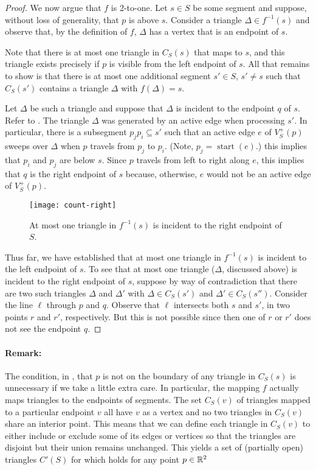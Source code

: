 \documentclass{patmorin}
\DeclareMathOperator{\start}{start}
\begin{document}
\begin{proof}
We now argue that $f$ is 2-to-one.  Let $s\in S$ be some segment and
suppose, without loss of generality, that $p$ is above $s$.  Consider a
triangle $\Delta \in f^{-1}(s)$ and observe that, by the definition of $f$,
$\Delta$ has a vertex that is an endpoint of $s$.

Note that there is at most one triangle in $C_S(s)$ that maps to $s$, and
this triangle exists precisely if $p$ is visible from the left endpoint of
$s$.  All that remains to show is that there is at most one additional
segment $s'\in S$, $s'\neq s$ such that $C_S(s')$ contains a triangle
$\Delta$ with $f(\Delta)=s$.

Let $\Delta$ be such a triangle and suppose that $\Delta$ is incident to
the endpoint $q$ of $s$.  Refer to .  The triangle
$\Delta$ was generated by an active edge when processing $s'$.  In
particular, there is a subsegment $p_j p_i\subseteq s'$ such that an active
edge $e$ of $V^+_S(p)$ sweeps over $\Delta$ when $p$ travels from $p_j$ to
$p_i$. (Note, $p_j=\start(e)$.) this implies that $p_i$ and $p_j$ are below
$s$. Since $p$ travels from left to right along $e$, this implies that $q$
is the right endpoint of $s$ because, otherwise, $e$ would not be an active
edge of $V^+_S(p)$.

\begin{figure}
  \begin{center}
    \texttt{[image: count-right]}
  \end{center}
  \caption{At most one triangle in $f^{-1}(s)$ is incident to the right
           endpoint of $S$.}
\end{figure}

Thus far, we have established that at most one triangle in $f^{-1}(s)$ is
incident to the left endpoint of $s$.  To see that at most one triangle
($\Delta$, discussed above) is incident to the right endpoint of $s$,
suppose by way of contradiction that there are two such triangles $\Delta$
and $\Delta'$ with $\Delta\in C_S(s')$ and $\Delta'\in C_S(s'')$.
Consider the line $\ell$ through $p$ and $q$.  Observe that $\ell$
intersects both $s$ and $s'$, in two points $r$ and $r'$, respectively. But
this is not possible since then one of $r$ or $r'$ does not see the
endpoint $q$.
\end{proof}

\paragraph{Remark:}
The condition, in , that $p$ is not on the boundary of
any triangle in $C_S(s)$ is unnecessary if we take a little extra care.
In particular, the mapping $f$ actually maps triangles to the endpoints of
segments.  The set $C_S(v)$ of triangles mapped to a particular endpoint
$v$ all have $v$ as a vertex and no two triangles in $C_S(v)$ share an
interior point.  This means that we can define each triangle in $C_S(v)$
to either include or exclude some of its edges or vertices so that the
triangles are disjoint but their union remains unchanged. This yields
a set of (partially open) triangles $C'(S)$ for which 
holds for any point $p\in\mathbb{R}^2$
\end{document}
